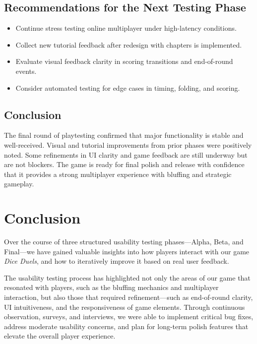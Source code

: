 \documentclass[12pt, titlepage]{article}
\begin{document}
\subsection{Recommendations for the Next Testing Phase}
\begin{itemize}
    \item Continue stress testing online multiplayer under high-latency conditions.
    \item Collect new tutorial feedback after redesign with chapters is implemented.
    \item Evaluate visual feedback clarity in scoring transitions and end-of-round events.
    \item Consider automated testing for edge cases in timing, folding, and scoring.
\end{itemize}

\subsection{Conclusion}
The final round of playtesting confirmed that major functionality is stable and well-received. Visual and tutorial improvements from prior phases were positively noted. Some refinements in UI clarity and game feedback are still underway but are not blockers. The game is ready for final polish and release with confidence that it provides a strong multiplayer experience with bluffing and strategic gameplay.

\newpage

\section{Conclusion}

Over the course of three structured usability testing phases—Alpha, Beta, and Final—we have gained valuable insights into how players interact with our game \textit{Dice Duels}, and how to iteratively improve it based on real user feedback.

The usability testing process has highlighted not only the areas of our game that resonated with players, such as the bluffing mechanics and multiplayer interaction, but also those that required refinement—such as end-of-round clarity, UI intuitiveness, and the responsiveness of game elements. Through continuous observation, surveys, and interviews, we were able to implement critical bug fixes, address moderate usability concerns, and plan for long-term polish features that elevate the overall player experience.
\end{document}
